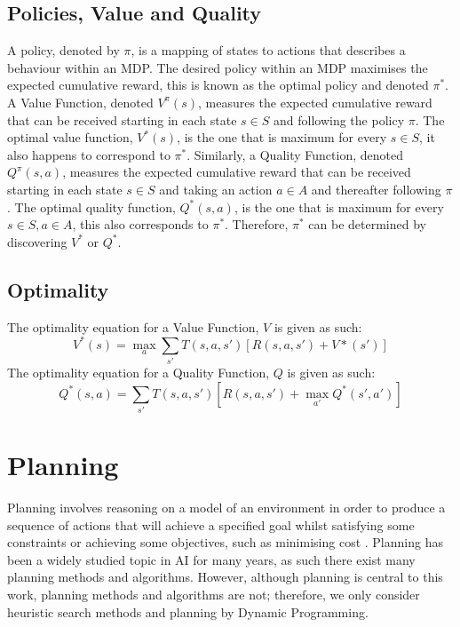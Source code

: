 \subsection{Policies, Value and Quality}
A policy, denoted by $\pi$, is a mapping of states to actions that describes a behaviour within an MDP. The desired policy within an MDP maximises the expected cumulative reward, this is known as the optimal policy and denoted $\pi^*$.
A Value Function, denoted $V^\pi(s)$, measures the expected cumulative reward that can be received starting in each state $s \in S$ and following the policy $\pi$. The optimal value function, $V^*(s)$, is the one that is maximum for every $s \in S$, it also happens to correspond to $\pi^*$.
Similarly, a Quality Function, denoted $Q^\pi(s,a)$, measures the expected cumulative reward that can be received starting in each state $s \in S$ and taking an action $a \in A$ and thereafter following $\pi$. The optimal quality function, $Q^*(s,a)$, is the one that is maximum for every $s \in S, a \in A$, this also corresponds to $\pi^*$. Therefore, $\pi^*$ can be determined by discovering $V^*$ or $Q^*$.
\subsection{Optimality}
The optimality equation for a Value Function, $V$ is given as such:
\begin{equation}
\label{eqn:vstar}
    V^*(s) = \max_a\sum_{s'}T(s,a,s')[R(s,a,s')+V*(s')]
\end{equation}
The optimality equation for a Quality Function, $Q$ is given as such:
\begin{equation}
\label{eqn:qstar}
Q^*(s,a) = \sum_{s'}T(s,a,s')[R(s,a,s')+\max_{a'}Q^*(s',a')]
\end{equation}

\section{Planning}
Planning involves reasoning on a model of an environment in order to produce a sequence of actions that will achieve a specified goal whilst satisfying some constraints or achieving some objectives, such as minimising cost \cite{DBLP:books/aw/RN2020, Lav06, GhallabNauTraverso04}. 
Planning has been a widely studied topic in AI for many years, as such there exist many planning methods and algorithms. However, although planning is central to this work, planning methods and algorithms are not; therefore, we only consider heuristic search methods and planning by Dynamic Programming.

